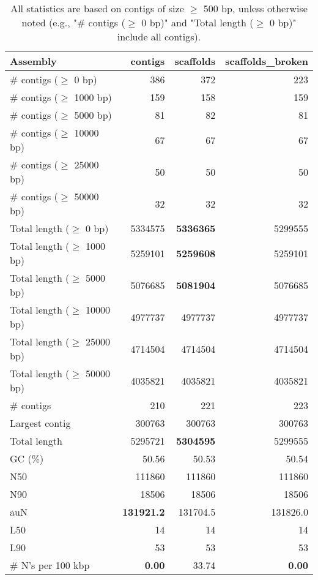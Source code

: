 \documentclass[12pt,a4paper]{article}
\begin{document}
\begin{table}[ht]
\begin{center}
\caption{All statistics are based on contigs of size $\geq$ 500 bp, unless otherwise noted (e.g., "\# contigs ($\geq$ 0 bp)" and "Total length ($\geq$ 0 bp)" include all contigs).}
\begin{tabular}{|l*{3}{|r}|}
\hline
Assembly & contigs & scaffolds & scaffolds\_broken \\ \hline
\# contigs ($\geq$ 0 bp) & 386 & 372 & 223 \\ \hline
\# contigs ($\geq$ 1000 bp) & 159 & 158 & 159 \\ \hline
\# contigs ($\geq$ 5000 bp) & 81 & 82 & 81 \\ \hline
\# contigs ($\geq$ 10000 bp) & 67 & 67 & 67 \\ \hline
\# contigs ($\geq$ 25000 bp) & 50 & 50 & 50 \\ \hline
\# contigs ($\geq$ 50000 bp) & 32 & 32 & 32 \\ \hline
Total length ($\geq$ 0 bp) & 5334575 & {\bf 5336365} & 5299555 \\ \hline
Total length ($\geq$ 1000 bp) & 5259101 & {\bf 5259608} & 5259101 \\ \hline
Total length ($\geq$ 5000 bp) & 5076685 & {\bf 5081904} & 5076685 \\ \hline
Total length ($\geq$ 10000 bp) & 4977737 & 4977737 & 4977737 \\ \hline
Total length ($\geq$ 25000 bp) & 4714504 & 4714504 & 4714504 \\ \hline
Total length ($\geq$ 50000 bp) & 4035821 & 4035821 & 4035821 \\ \hline
\# contigs & 210 & 221 & 223 \\ \hline
Largest contig & 300763 & 300763 & 300763 \\ \hline
Total length & 5295721 & {\bf 5304595} & 5299555 \\ \hline
GC (\%) & 50.56 & 50.53 & 50.54 \\ \hline
N50 & 111860 & 111860 & 111860 \\ \hline
N90 & 18506 & 18506 & 18506 \\ \hline
auN & {\bf 131921.2} & 131704.5 & 131826.0 \\ \hline
L50 & 14 & 14 & 14 \\ \hline
L90 & 53 & 53 & 53 \\ \hline
\# N's per 100 kbp & {\bf 0.00} & 33.74 & {\bf 0.00} \\ \hline
\end{tabular}
\end{center}
\end{table}
\end{document}
